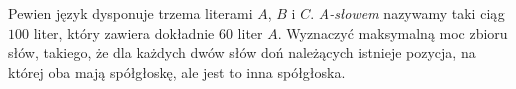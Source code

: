 \begin{problem}{1}

\end{problem}


\begin{problem}{1}
	Pewien język dysponuje trzema literami $A$, $B$ i $C$. \textit{A-słowem} nazywamy taki ciąg $100$ liter, który zawiera dokładnie $60$ liter $A$. Wyznaczyć maksymalną moc zbioru słów, takiego, że dla każdych dwów słów doń należących istnieje pozycja, na której oba mają spółgłoskę, ale jest to inna spółgłoska.
\end{problem}